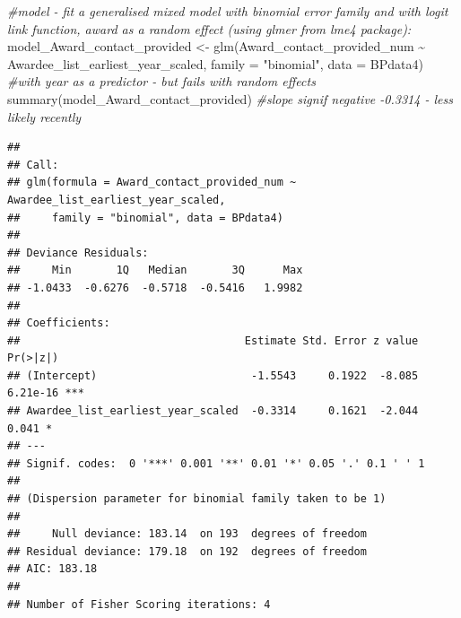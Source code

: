 \documentclass[
]{article}
\newenvironment{Shaded}{\begin{snugshade}}{\end{snugshade}}
\newcommand{\AttributeTok}[1]{\textcolor[rgb]{0.77,0.63,0.00}{#1}}
\newcommand{\CommentTok}[1]{\textcolor[rgb]{0.56,0.35,0.01}{\textit{#1}}}
\newcommand{\DocumentationTok}[1]{\textcolor[rgb]{0.56,0.35,0.01}{\textbf{\textit{#1}}}}
\newcommand{\FunctionTok}[1]{\textcolor[rgb]{0.00,0.00,0.00}{#1}}
\newcommand{\NormalTok}[1]{#1}
\newcommand{\OtherTok}[1]{\textcolor[rgb]{0.56,0.35,0.01}{#1}}
\newcommand{\SpecialCharTok}[1]{\textcolor[rgb]{0.00,0.00,0.00}{#1}}
\newcommand{\StringTok}[1]{\textcolor[rgb]{0.31,0.60,0.02}{#1}}
\begin{document}
\begin{Shaded}
\begin{Highlighting}[]
\CommentTok{\#model {-} fit a generalised mixed model with binomial error family and with logit link function, award as a random effect (using glmer from lme4 package):}
\NormalTok{model\_Award\_contact\_provided }\OtherTok{\textless{}{-}} \FunctionTok{glm}\NormalTok{(Award\_contact\_provided\_num }\SpecialCharTok{\textasciitilde{}}\NormalTok{ Awardee\_list\_earliest\_year\_scaled, }\AttributeTok{family =} \StringTok{"binomial"}\NormalTok{, }\AttributeTok{data =}\NormalTok{ BPdata4) }\CommentTok{\#with year as a predictor {-} but fails with random effects}
\FunctionTok{summary}\NormalTok{(model\_Award\_contact\_provided) }\CommentTok{\#slope signif negative {-}0.3314 {-} less likely recently}
\end{Highlighting}
\end{Shaded}

\begin{verbatim}
## 
## Call:
## glm(formula = Award_contact_provided_num ~ Awardee_list_earliest_year_scaled, 
##     family = "binomial", data = BPdata4)
## 
## Deviance Residuals: 
##     Min       1Q   Median       3Q      Max  
## -1.0433  -0.6276  -0.5718  -0.5416   1.9982  
## 
## Coefficients:
##                                   Estimate Std. Error z value Pr(>|z|)    
## (Intercept)                        -1.5543     0.1922  -8.085 6.21e-16 ***
## Awardee_list_earliest_year_scaled  -0.3314     0.1621  -2.044    0.041 *  
## ---
## Signif. codes:  0 '***' 0.001 '**' 0.01 '*' 0.05 '.' 0.1 ' ' 1
## 
## (Dispersion parameter for binomial family taken to be 1)
## 
##     Null deviance: 183.14  on 193  degrees of freedom
## Residual deviance: 179.18  on 192  degrees of freedom
## AIC: 183.18
## 
## Number of Fisher Scoring iterations: 4
\end{verbatim}

\begin{Shaded}
\end{Shaded}
\end{document}
